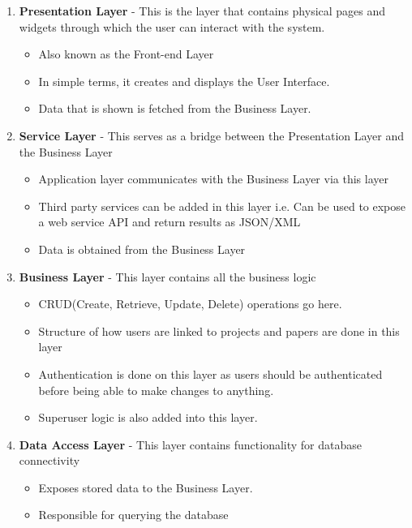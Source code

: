 \documentclass[a4paper,12pt]{report}
\begin{document}
\begin{enumerate}
	\item \textbf{Presentation Layer} - This is the layer that contains physical pages and widgets through which the user can interact with the system. 

	\begin{itemize}
		\item Also known as the Front-end Layer
		\item In simple terms, it creates and displays the User Interface.
		\item Data that is shown is fetched from the Business Layer.
	\end{itemize}

	\item \textbf{Service Layer} - This serves as a bridge between the Presentation Layer and the Business Layer

	\begin{itemize}
		\item Application layer communicates with the Business Layer via this layer
		\item Third party services can be added in this layer i.e. Can be used to expose a web service API and return results as JSON/XML 
		\item Data is obtained from the Business Layer
	\end{itemize}

	\item \textbf{Business Layer} - This layer contains all the business logic
	\begin{itemize}
		\item CRUD(Create, Retrieve, Update, Delete) operations go here.
		\item Structure of how users are linked to projects and papers are done in this layer
		\item Authentication is done on this layer as users should be authenticated before being able to make changes to anything.
		\item Superuser logic is also added into this layer.
	\end{itemize}

	\begin{itemize}
		
	\end{itemize}

	\item \textbf{Data Access Layer} - This layer contains functionality for database connectivity
	\begin{itemize}
		\item Exposes stored data to the Business Layer.
		\item Responsible for querying the database
	\end{itemize}
\end{enumerate}
\end{document}
